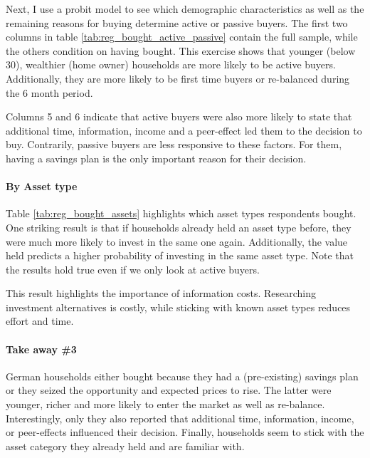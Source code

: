 \documentclass[ProjectABM]{subfiles}
\begin{document}

Next, I use a probit model to see which demographic characteristics as well as the remaining reasons for buying determine active or passive buyers. The first two columns in table \ref{tab:reg_bought_active_passive} contain the full sample, while the others condition on having bought. This exercise shows that younger (below 30), wealthier (home owner) households are more likely to be active buyers. Additionally, they are more likely to be first time buyers or re-balanced during the 6 month period.

Columns 5 and 6 indicate that active buyers were also more likely to state that additional time, information, income and a peer-effect led them to the decision to buy. Contrarily, passive buyers are less responsive to these factors. For them, having a savings plan is the only important reason for their decision.





\paragraph{By Asset type}
Table \ref{tab:reg_bought_assets} highlights which asset types respondents bought. One striking result is that if households already held an asset type before, they were much more likely to invest in the same one again. Additionally, the value held predicts a higher probability of investing in the same asset type. Note that the results hold true even if we only look at active buyers.

This result highlights the importance of information costs. Researching investment alternatives is costly, while sticking with known asset types reduces effort and time.%



\paragraph{Take away \#3}
German households either bought because they had a (pre-existing) savings plan or they seized the opportunity and expected prices to rise. The latter were younger, richer and more likely to enter the market as well as re-balance. Interestingly, only they also reported that additional time, information, income, or peer-effects influenced their decision. Finally, households seem to stick with the asset category they already held and are familiar with.
\end{document}
